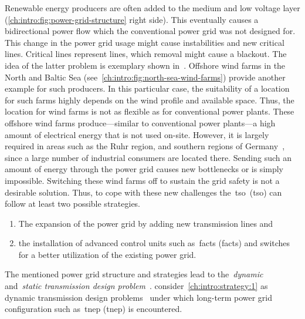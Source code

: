 Renewable energy producers are often added to the medium and low voltage layer
(\cref{ch:intro:fig:power-grid-structure} right side). This eventually causes a
bidirectional power flow which the conventional power grid was not designed for.
This change in the power grid usage might cause instabilities and new critical
lines. Critical lines represent lines, which removal might cause a blackout. The
idea of the latter problem is exemplary shown in~\parencite{Wit16}. Offshore
wind farms in the North and Baltic Sea
(see~\cref{ch:intro:fig:north-sea-wind-farms}) provide another example for such
producers. In this particular case, the suitability of a location for such farms
highly depends on the wind profile and available space. Thus, the location for
wind farms is not as flexible as for conventional power plants. These offshore
wind farms produce---similar to conventional power plants---a high amount of
electrical energy that is not used on-site. However, it is largely required in
areas such as the Ruhr region, and southern regions of
Germany~\parencite{online:europe:project132:hvdc-line-a-north,online:europe:project235:HVDC_SuedLink_Brunsbuettel_Wilster-to-Grossgartach_Grafenrheinfeld,online:europe:TYNDP-2018-Projects-Sheets-166,online:europe:north-south-interconnections},
since a large number of industrial consumers are located there. Sending such an
amount of energy through the power grid causes new bottlenecks or is simply
impossible. Switching these wind farms off to sustain the grid safety is not a
desirable solution. Thus, to cope with these new challenges
the~\acrlong{tso}~(\gls{tso}) can follow at least two possible strategies.
% 
\begin{enumerate}[(S1)]
    \item The expansion of the power grid by adding new transmission lines and
    \label{ch:intro:strategy:1}
    \item the installation of advanced control units such as~\acrlong{facts} 
    (\gls{facts}) and switches for a better utilization of the existing power
    grid.
    \label{ch:intro:strategy:2}
\end{enumerate}
% 
The mentioned power grid structure and strategies lead to the~\emph{dynamic}
and~\emph{static transmission design problem}~\parencite{Bin01a}.
\textcite{Bin01a} consider~\cref{ch:intro:strategy:1} as dynamic transmission
design problems~\parencite{Gal92,Cho06,Bin01a} under which long-term power
grid configuration such as~\acrlong{tnep} (\gls{tnep}) is encountered.
